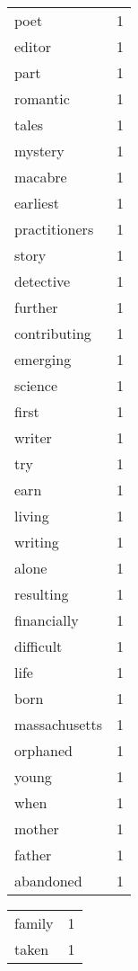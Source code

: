 \begin{center}
\begin{scriptsize}
\begin{tabular}{|ll|}
\hline
\end{tabular}
\begin{tabular}{|ll|}
\hline
poet          & 1\\%
editor        & 1\\%
part          & 1\\%
romantic      & 1\\%
tales         & 1\\%
mystery       & 1\\%
macabre       & 1\\%
earliest      & 1\\%
practitioners & 1\\%
story         & 1\\%
detective     & 1\\%
further       & 1\\%
contributing  & 1\\%
emerging      & 1\\%
science       & 1\\%
first         & 1\\%
writer        & 1\\%
try           & 1\\%
earn          & 1\\%
living        & 1\\%
writing       & 1\\%
alone         & 1\\%
resulting     & 1\\%
financially   & 1\\%
difficult     & 1\\%
life          & 1\\%
born          & 1\\%
massachusetts & 1\\%
orphaned      & 1\\%
young         & 1\\%
when          & 1\\%
mother        & 1\\%
father        & 1\\%
abandoned     & 1\\%
\hline
\end{tabular}
\begin{tabular}{|ll|}
\hline
family        & 1\\%
taken         & 1\\%

\end{tabular}
\end{scriptsize}
\end{center}
